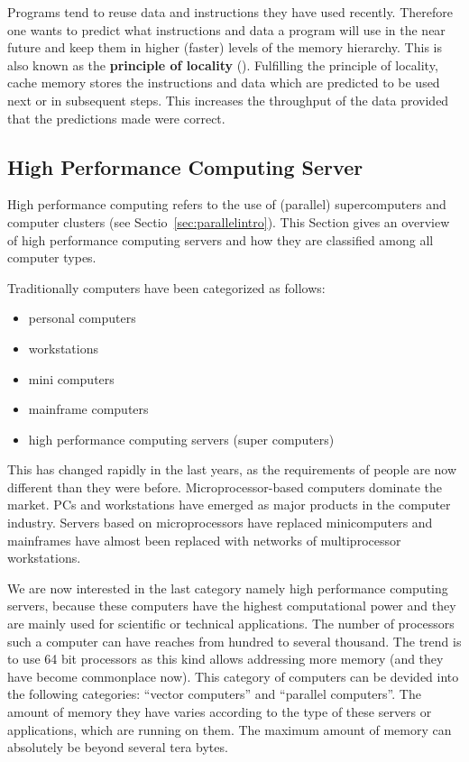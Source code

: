 Programs tend to reuse data and instructions they have used
recently. Therefore one wants to predict what instructions and data a
program will use in the near future and keep them in higher (faster)
levels of the memory hierarchy. This is also known as the
\textbf{principle of locality} (\cite{C1quant07}). Fulfilling the
principle of locality, cache memory stores the 
instructions and data which are predicted to be used next or in
subsequent steps. This increases the throughput of the data provided that
the predictions made were correct.

\subsection{High Performance Computing Server}
\label{sec:hpcserver}

High performance computing refers to the use of (parallel)
supercomputers and computer clusters (see
Sectio~\ref{sec:parallelintro}). This Section gives an overview of
high performance computing servers and how they are classified
among all computer types.


Traditionally computers have been categorized as follows:
\begin{itemize}
\item personal computers
\item workstations
\item mini computers
\item mainframe computers
\item high performance computing servers (super computers)
\end{itemize}

This has changed rapidly in the last years, as the requirements of
people are now different than they were before. Microprocessor-based
computers dominate the market. PCs and workstations have emerged as
major products in the computer industry. Servers based on
microprocessors have replaced minicomputers and mainframes have almost
been replaced with networks of multiprocessor workstations.

We are now interested in the last category namely high performance
computing servers, because these computers have the highest
computational power and they are mainly used
for scientific or technical applications. The number of processors
such a computer can have reaches from hundred to several thousand. The
trend is to use 64 bit processors as this kind allows addressing more
memory (and they have become commonplace now). 
This category of computers can be devided into the following
categories: ``vector computers'' and ``parallel computers''.
The amount of memory they have varies according to the type of
these servers or applications, which are running on them. The maximum
amount of memory can absolutely be beyond several tera bytes.  

